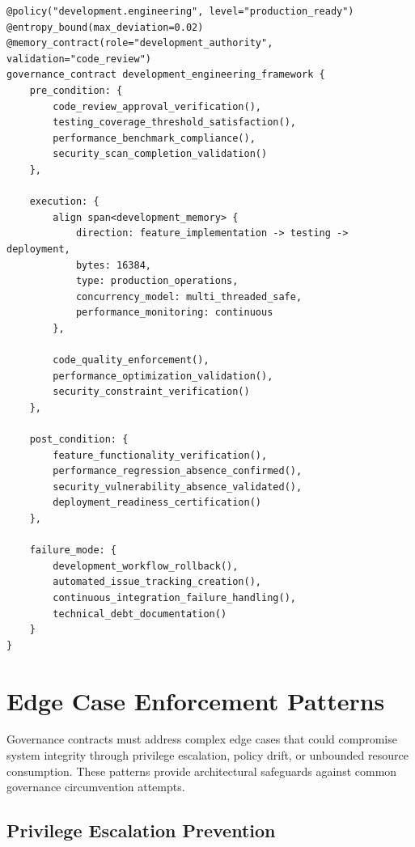 \documentclass[11pt,letterpaper]{article}
\begin{document}
\begin{lstlisting}[language=rift, caption=Development Engineering Contract Template]
@policy("development.engineering", level="production_ready")
@entropy_bound(max_deviation=0.02)
@memory_contract(role="development_authority", validation="code_review")
governance_contract development_engineering_framework {
    pre_condition: {
        code_review_approval_verification(),
        testing_coverage_threshold_satisfaction(),
        performance_benchmark_compliance(),
        security_scan_completion_validation()
    },
    
    execution: {
        align span<development_memory> {
            direction: feature_implementation -> testing -> deployment,
            bytes: 16384,
            type: production_operations,
            concurrency_model: multi_threaded_safe,
            performance_monitoring: continuous
        },
        
        code_quality_enforcement(),
        performance_optimization_validation(),
        security_constraint_verification()
    },
    
    post_condition: {
        feature_functionality_verification(),
        performance_regression_absence_confirmed(),
        security_vulnerability_absence_validated(),
        deployment_readiness_certification()
    },
    
    failure_mode: {
        development_workflow_rollback(),
        automated_issue_tracking_creation(),
        continuous_integration_failure_handling(),
        technical_debt_documentation()
    }
}
\end{lstlisting}

\section{Edge Case Enforcement Patterns}

Governance contracts must address complex edge cases that could compromise system integrity through privilege escalation, policy drift, or unbounded resource consumption. These patterns provide architectural safeguards against common governance circumvention attempts.

\subsection{Privilege Escalation Prevention}
\end{document}
